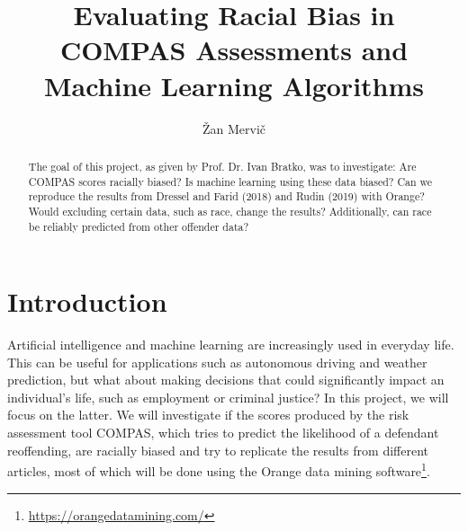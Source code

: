 \documentclass[sigconf,nonacm]{acmart}
\begin{document}
\title{Evaluating Racial Bias in COMPAS Assessments and Machine Learning Algorithms}


\author{\v{Z}an Mervi\v{c}}

\begin{abstract}
 The goal of this project, as given by Prof. Dr. Ivan Bratko, was to investigate: Are COMPAS scores racially biased? Is machine learning using these data biased? Can we reproduce the results from Dressel and Farid (2018)\cite{dressel2018accuracy} and Rudin (2019)\cite{rudin2019stop} with Orange? Would excluding certain data, such as race, change the results? Additionally, can race be reliably predicted from other offender data?
\end{abstract}

\maketitle

\section{Introduction}
Artificial intelligence and machine learning are increasingly used in everyday life. This can be useful for applications such as autonomous driving and weather prediction, but what about making decisions that could significantly impact an individual's life, such as employment or criminal justice? In this project, we will focus on the latter. We will investigate if the scores produced by the risk assessment tool COMPAS, which tries to predict the likelihood of a defendant reoffending, are racially biased and try to replicate the results from different articles, most of which will be done using the Orange data mining software\footnote{\url{https://orangedatamining.com/}}.
\end{document}
